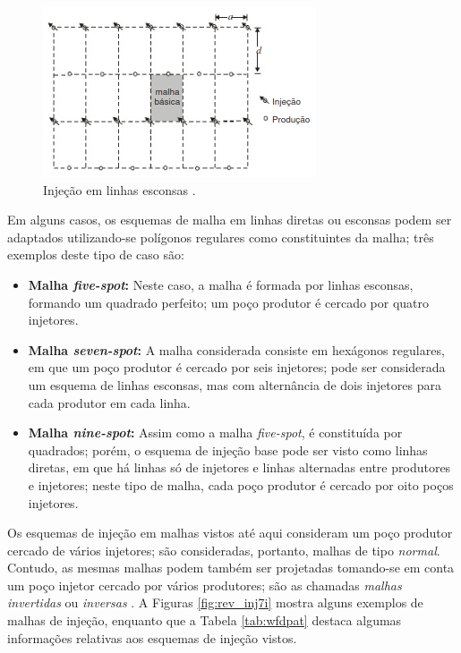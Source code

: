 \begin{figure}[!ht]
\centering
\includegraphics[width=.6\textwidth]{figs/revisao/revisao_injle.png}
\caption{Inje\c{c}\~{a}o em linhas esconsas \cite[p. 567]{engres}.}
\label{fig:rev_injle}
\end{figure}

Em alguns casos, os esquemas de malha em linhas diretas ou esconsas podem ser adaptados utilizando-se pol\'{i}gonos regulares como constituintes da malha; tr\^{e}s exemplos deste tipo de caso s\~{a}o:
\begin{itemize}
\item \textbf{Malha \textit{five-spot}:} Neste caso, a malha \'{e} formada por linhas esconsas, formando um quadrado perfeito; um po\c{c}o produtor \'{e} cercado por quatro injetores.
\item \textbf{Malha \textit{seven-spot}:} A malha considerada consiste em hex\'{a}gonos regulares, em que um po\c{c}o produtor \'{e} cercado por seis injetores; pode ser considerada um esquema de linhas esconsas, mas com altern\^{a}ncia de dois injetores para cada produtor em cada linha.
\item \textbf{Malha \textit{nine-spot}:} Assim como a malha \textit{five-spot}, \'{e} constitu\'{i}da por quadrados; por\'{e}m, o esquema de inje\c{c}\~{a}o base pode ser visto como linhas diretas, em que h\'{a} linhas s\'{o} de injetores e linhas alternadas entre produtores e injetores; neste tipo de malha, cada po\c{c}o produtor \'{e} cercado por oito po\c{c}os injetores.
\end{itemize}

Os esquemas de inje\c{c}\~{a}o em malhas vistos at\'{e} aqui consideram um po\c{c}o produtor cercado de v\'{a}rios injetores; s\~{a}o consideradas, portanto, malhas de tipo \textit{normal}. Contudo, as mesmas malhas podem tamb\'{e}m ser projetadas tomando-se em conta um po\c{c}o injetor cercado por v\'{a}rios produtores; s\~{a}o as chamadas \textit{malhas invertidas} ou \textit{inversas} \cite[p. 569]{engres}. A Figuras \ref{fig:rev_inj7i} mostra alguns exemplos de malhas de inje\c{c}\~{a}o, enquanto que a Tabela \ref{tab:wfdpat} destaca algumas informa\c{c}\~{o}es relativas aos esquemas de inje\c{c}\~{a}o vistos.


